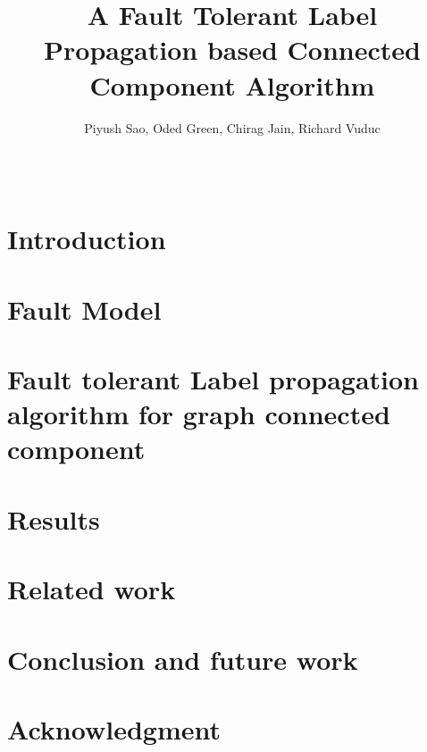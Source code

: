 \documentclass[english]{sig-alternate-05-2015}
\theoremstyle{plain}
\theoremstyle{definition}
\begin{document}

\title{A Fault Tolerant Label Propagation based Connected Component Algorithm }

  \author{
  \alignauthor
    Piyush Sao, Oded Green, Chirag Jain, Richard Vuduc \\
      \\
      \\
  }


\maketitle





\section{Introduction}

\label{sec:intro}

\section{Fault Model}

\label{sec:fault}

\section{Fault tolerant Label propagation algorithm for graph connected component}

\label{sec:connected}

\section{Results}

\label{sec:results}

\section{Related work}

\label{sec:related}

\section{Conclusion and future work}

\label{sec:conclusion}

\section{Acknowledgment}

\end{document}
